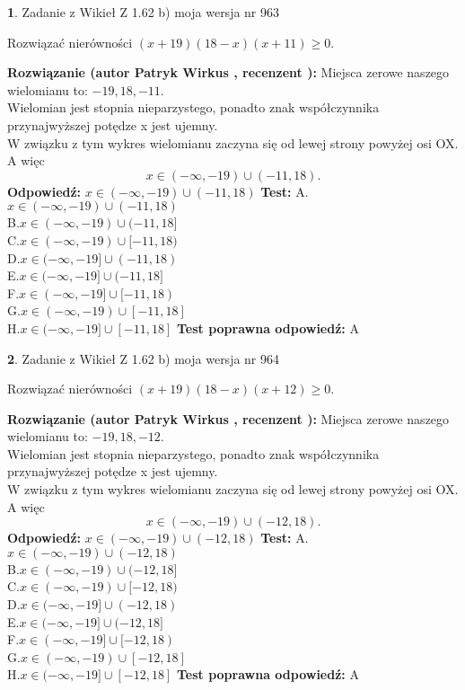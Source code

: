 \documentclass[12pt, a4paper]{article}
\theoremstyle{definition} %
\newtheorem{zad}{}
\newcommand{\zadStart}[1]{\begin{zad}#1\newline}
\newcommand{\zadStop}{\end{zad}}
\newcommand{\rozwStart}[2]{\noindent \textbf{Rozwiązanie (autor #1 , recenzent #2): }\newline}
\newcommand{\rozwStop}{\newline}
\newcommand{\odpStart}{\noindent \textbf{Odpowiedź:}\newline}
\newcommand{\odpStop}{\newline}
\newcommand{\testStart}{\noindent \textbf{Test:}\newline}
\newcommand{\testStop}{\newline}
\newcommand{\kluczStart}{\noindent \textbf{Test poprawna odpowiedź:}\newline}
\newcommand{\kluczStop}{\newline}
\begin{document}
\zadStart{Zadanie z Wikieł Z 1.62 b) moja wersja nr 963}

Rozwiązać nierówności $(x+19)(18-x)(x+11)\ge0$.
\zadStop
\rozwStart{Patryk Wirkus}{}
Miejsca zerowe naszego wielomianu to: $-19, 18, -11$.\\
Wielomian jest stopnia nieparzystego, ponadto znak współczynnika przy\linebreak najwyższej potędze x jest ujemny.\\ W związku z tym wykres wielomianu zaczyna się od lewej strony powyżej osi OX. A więc $$x \in (-\infty,-19) \cup (-11,18).$$
\rozwStop
\odpStart
$x \in (-\infty,-19) \cup (-11,18)$
\odpStop
\testStart
A.$x \in (-\infty,-19) \cup (-11,18)$\\
B.$x \in (-\infty,-19) \cup (-11,18]$\\
C.$x \in (-\infty,-19) \cup [-11,18)$\\
D.$x \in (-\infty,-19] \cup (-11,18)$\\
E.$x \in (-\infty,-19] \cup (-11,18]$\\
F.$x \in (-\infty,-19] \cup [-11,18)$\\
G.$x \in (-\infty,-19) \cup [-11,18]$\\
H.$x \in (-\infty,-19] \cup [-11,18]$
\testStop
\kluczStart
A
\kluczStop



\zadStart{Zadanie z Wikieł Z 1.62 b) moja wersja nr 964}

Rozwiązać nierówności $(x+19)(18-x)(x+12)\ge0$.
\zadStop
\rozwStart{Patryk Wirkus}{}
Miejsca zerowe naszego wielomianu to: $-19, 18, -12$.\\
Wielomian jest stopnia nieparzystego, ponadto znak współczynnika przy\linebreak najwyższej potędze x jest ujemny.\\ W związku z tym wykres wielomianu zaczyna się od lewej strony powyżej osi OX. A więc $$x \in (-\infty,-19) \cup (-12,18).$$
\rozwStop
\odpStart
$x \in (-\infty,-19) \cup (-12,18)$
\odpStop
\testStart
A.$x \in (-\infty,-19) \cup (-12,18)$\\
B.$x \in (-\infty,-19) \cup (-12,18]$\\
C.$x \in (-\infty,-19) \cup [-12,18)$\\
D.$x \in (-\infty,-19] \cup (-12,18)$\\
E.$x \in (-\infty,-19] \cup (-12,18]$\\
F.$x \in (-\infty,-19] \cup [-12,18)$\\
G.$x \in (-\infty,-19) \cup [-12,18]$\\
H.$x \in (-\infty,-19] \cup [-12,18]$
\testStop
\kluczStart
A
\kluczStop
\end{document}

